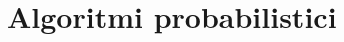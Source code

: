\documentclass[\main/main.tex]{subfiles}
\begin{document}
\chapter{Algoritmi probabilistici}
\end{document}
